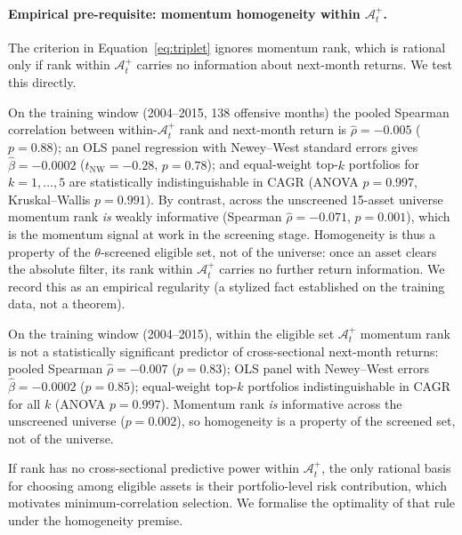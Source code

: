\paragraph{Empirical pre-requisite: momentum homogeneity within $\mathcal{A}_t^+$.}
The criterion in Equation~\eqref{eq:triplet} ignores momentum rank, which is
rational only if rank within $\mathcal{A}_t^+$ carries no information about
next-month returns. We test this directly.

On the training window (2004--2015, 138 offensive months) the pooled
Spearman correlation between within-$\mathcal{A}_t^+$ rank and next-month return is
$\hat{\rho} = -0.005$ ($p = 0.88$); an OLS panel regression with Newey--West
standard errors gives $\hat{\beta} = -0.0002$ ($t_{\mathrm{NW}} = -0.28$,
$p = 0.78$); and equal-weight top-$k$ portfolios for $k = 1,\ldots,5$ are
statistically indistinguishable in CAGR (ANOVA $p = 0.997$, Kruskal--Wallis
$p = 0.991$). By contrast, across the unscreened 15-asset universe momentum
rank \emph{is} weakly informative (Spearman $\hat{\rho} = -0.071$, $p = 0.001$),
which is the momentum signal at work in the screening stage.
Homogeneity is thus a property of the $\theta$-screened eligible set, not of the
universe: once an asset clears the absolute filter, its rank within
$\mathcal{A}_t^+$ carries no further return information. We record this as an
empirical regularity (a stylized fact established on the training data, not a
theorem).

\begin{lemma}
\label{lem:homogeneity}
On the training window (2004--2015), within the eligible set
$\mathcal{A}_t^+$ momentum rank is not a statistically significant predictor of
cross-sectional next-month returns: pooled Spearman $\hat{\rho} = -0.007$
($p = 0.83$); OLS panel with Newey--West errors $\hat{\beta} = -0.0002$
($p = 0.85$); equal-weight top-$k$ portfolios indistinguishable in CAGR for all
$k$ (ANOVA $p = 0.997$). Momentum rank \emph{is} informative across the unscreened
universe ($p = 0.002$), so homogeneity is a property of the screened set, not of
the universe.
\end{lemma}

If rank has no cross-sectional predictive power within $\mathcal{A}_t^+$, the only
rational basis for choosing among eligible assets is their portfolio-level risk
contribution, which motivates minimum-correlation selection. We formalise the
optimality of that rule under the homogeneity premise.

